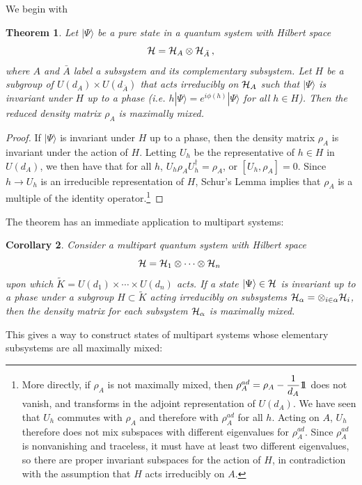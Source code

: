 \documentclass[12pt]{article}
\newtheorem{theorem}{Theorem}[section]
\newtheorem{corollary}[theorem]{Corollary}
\theoremstyle{definition}
\def\identity{{\rlap{1} \hskip 1.6pt \hbox{1}}}
\begin{document}
We begin with
\begin{theorem}
Let $|\Psi \rangle$ be a pure state in a quantum system with Hilbert space
\[
{\cal H} = {\cal H}_A \otimes {\cal H}_{\bar{A}} \, ,
\]
where $A$ and $\bar{A}$ label a subsystem and its complementary
subsystem. Let $H$ be a subgroup of $U(d_A) \times U(d_{\bar{A}})$
that acts irreducibly on ${\cal H}_A$ such that $|\Psi \rangle$ is
invariant under $H$ up to a phase (i.e. $h|\Psi \rangle = e^{i
\phi(h)}|\Psi \rangle$ for all $h \in H$). Then the reduced density
matrix $\rho_A$ is maximally mixed.
\end{theorem}
\begin{proof}
If $|\Psi \rangle$ is invariant under $H$ up to a phase, then the density matrix $\rho_A$ is invariant under the action of $H$. Letting $U_h$ be the representative of $h \in H$ in $U(d_A)$, we then have that for all $h$, $U_h \rho_A U_h^\dagger = \rho_A$, or $[U_h, \rho_A] = 0$. Since $h \to U_h$ is an irreducible representation of $H$, Schur's Lemma implies that $\rho_A$ is a multiple of the identity operator.\footnote{More directly, if $\rho_A$ is not maximally mixed, then $\rho_A^{ad} = \rho_A - \dfrac{1}{d_A} \identity$ does not vanish, and transforms in the adjoint representation of $U(d_A)$. We have seen that $U_h$ commutes with $\rho_A$ and therefore with $\rho^{ad}_A$ for all $h$. Acting on $A$, $U_h$ therefore does not mix subspaces with different eigenvalues for $\rho^{ad}_A$. Since $\rho^{ad}_A$ is nonvanishing and traceless, it must have at least two different eigenvalues, so there are proper invariant subspaces for the action of $H$, in contradiction with the assumption that $H$ acts irreducibly on $A$.}
\end{proof}
The theorem has an immediate application to multipart systems:
\begin{corollary}
Consider a multipart quantum system with Hilbert space
\[
{\cal H} = {\cal H}_1 \otimes \cdots \otimes {\cal H}_n \;
\]
upon which $\tilde{K} = U(d_1) \times \cdots \times U(d_n)$ acts. If a state $|\Psi \rangle \in {\cal H}$ is invariant up to a phase under a subgroup $H \subset \tilde{K}$ acting irreducibly on subsystems ${\cal H}_{\alpha} = \otimes_{i \in \alpha} {\cal H}_i$, then the density matrix for each subsystem ${\cal H}_{\alpha}$ is maximally mixed.
\end{corollary}
This gives a way to construct states of multipart systems whose elementary subsystems are all maximally mixed:
\end{document}
